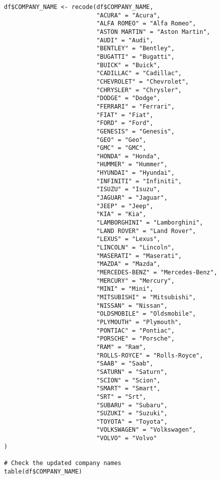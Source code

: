 \documentclass[12pt, a4paper,oneside]{book}
\numberwithin{equation}{section}
\begin{document}
\begin{lstlisting}
df$COMPANY_NAME <- recode(df$COMPANY_NAME,
                          "ACURA" = "Acura",
                          "ALFA ROMEO" = "Alfa Romeo",
                          "ASTON MARTIN" = "Aston Martin",
                          "AUDI" = "Audi",
                          "BENTLEY" = "Bentley",
                          "BUGATTI" = "Bugatti",
                          "BUICK" = "Buick",
                          "CADILLAC" = "Cadillac",
                          "CHEVROLET" = "Chevrolet",
                          "CHRYSLER" = "Chrysler",
                          "DODGE" = "Dodge",
                          "FERRARI" = "Ferrari",
                          "FIAT" = "Fiat",
                          "FORD" = "Ford",
                          "GENESIS" = "Genesis",
                          "GEO" = "Geo",
                          "GMC" = "GMC",
                          "HONDA" = "Honda",
                          "HUMMER" = "Hummer",
                          "HYUNDAI" = "Hyundai",
                          "INFINITI" = "Infiniti",
                          "ISUZU" = "Isuzu",
                          "JAGUAR" = "Jaguar",
                          "JEEP" = "Jeep",
                          "KIA" = "Kia",
                          "LAMBORGHINI" = "Lamborghini",
                          "LAND ROVER" = "Land Rover",
                          "LEXUS" = "Lexus",
                          "LINCOLN" = "Lincoln",
                          "MASERATI" = "Maserati",
                          "MAZDA" = "Mazda",
                          "MERCEDES-BENZ" = "Mercedes-Benz",
                          "MERCURY" = "Mercury",
                          "MINI" = "Mini",
                          "MITSUBISHI" = "Mitsubishi",
                          "NISSAN" = "Nissan",
                          "OLDSMOBILE" = "Oldsmobile",
                          "PLYMOUTH" = "Plymouth",
                          "PONTIAC" = "Pontiac",
                          "PORSCHE" = "Porsche",
                          "RAM" = "Ram",
                          "ROLLS-ROYCE" = "Rolls-Royce",
                          "SAAB" = "Saab",
                          "SATURN" = "Saturn",
                          "SCION" = "Scion",
                          "SMART" = "Smart",
                          "SRT" = "Srt",
                          "SUBARU" = "Subaru",
                          "SUZUKI" = "Suzuki",
                          "TOYOTA" = "Toyota",
                          "VOLKSWAGEN" = "Volkswagen",
                          "VOLVO" = "Volvo"
)

# Check the updated company names
table(df$COMPANY_NAME)




\end{lstlisting}
\end{document}
